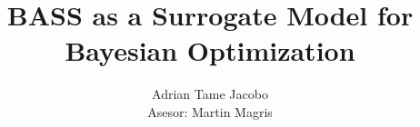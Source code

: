 \documentclass[a4paper,12pt]{book}
\begin{document}
	
\newtheorem{definition}{Definition}
\newtheorem{theorem}{Theorem}
\newtheorem{lemma}{Lemma}

\author{Adrian Tame Jacobo \\[0.6em] {\normalsize Asesor: Martin Magris}}
\title{BASS as a Surrogate Model for Bayesian Optimization}
\date{} %

\frontmatter
\maketitle
\tableofcontents

\mainmatter











\backmatter



\end{document}
